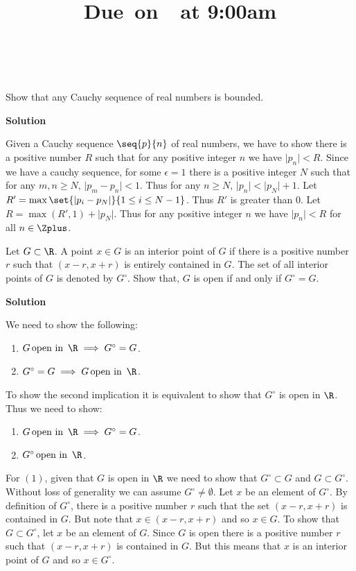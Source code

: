 \documentclass[11pt]{amstext-l}
\title{\vspace{2in}
    \textmd{\textbf{\hmwkClass{STAT 620:\ Introduction to Measure Theoretic Probability}\\
	    \hmwkTitle{1}}}\\
    \normalsize\vspace{0.1in}\small{Due\ on\ \hmwkDueDate{Feb 11,2015}\ at 9:00am}\\
    \vspace{0.1in}\large{\textit{\hmwkClassInstructor{Prof.\ Don Estep}\ 
	    \hmwkClassTime{T-TH:\ 9\textemdash10:15am}}}
    \vspace{3in}}
\author{\textbf{\hmwkAuthorName{Nishant Panda}}}
\date{}
\newcommand{\solution}{\textbf{\large Solution}}
\begin{document}
\maketitle

\pagebreak
\begin{homeworkProblem}[1]
    Show that any Cauchy sequence of real numbers is bounded. 
    
    \solution{}

    Given a Cauchy sequence $\seq{p}{n}$ of real numbers, we have to show there is a positive
    number $R$ such that for any positive integer $n$ we have $\lvert p_n \rvert < R$.
    Since we have a cauchy sequence, for some $\epsilon = 1$ there is a positive integer $N$ such
    that for any $m,n \geq N$, $\lvert p_m - p_n \rvert < 1$. Thus for any $n \geq N$, $\lvert p_n
    \rvert < \lvert p_N \rvert + 1$. Let $R' = \max\set{\lvert p_i - p_N \rvert}{1\leq i \leq N-1}$. 
    Thus $R'$ is greater than $0$. Let $R = \max(R',1) + \lvert p_N \rvert$. 
    Thus for any positive integer $n$ we have $\lvert p_n \rvert < R $ for all $n
    \in \Zplus$.
\end{homeworkProblem}

\pagebreak
\begin{homeworkProblem}[2]
    Let $G \subset \R$. A point $x \in G$ is an interior point of $G$ if there is a positive number
    $r$ such that $\left(x-r,x+r\right)$ is entirely contained in $G$. The set of all interior
    points of $G$ is denoted by $G^{\circ}$. Show that,
    $G$ is open if and only if $G^{\circ} = G$.
\end{homeworkProblem}

\solution{}

We need to show the following:
\begin{enumerate}
    \item $G \text{\,open in \,} \R \implies G^{\circ} = G$. 
    \item $G^{\circ} = G \implies G \text{\,open in \,} \R$. 
\end{enumerate}
To show the second implication it is equivalent to show that $G^{\circ}$ is open in $\R$. Thus we
need to show:
\begin{enumerate}
    \item $G \text{\,open in \,} \R \implies G^{\circ} = G$. 
    \item $G^{\circ} \text{\,open in \,} \R$. 
\end{enumerate}
For $(1)$, given that $G$ is open in $\R$ we need to show that $G^{\circ} \subset G$ and $G \subset
G^{\circ}$. Without loss of generality we can assume $G^{\circ} \neq \emptyset$. Let $x$ be an
element of $G^{\circ}$. By definition of $G^{\circ}$, there is a positive number $r$ such that the
set $(x-r,x+r)$ is contained in $G$. But note that $x \in (x-r,x+r)$ and so $x \in G$.
To show that $G \subset G^{\circ}$, let $x$ be an element of $G$. Since $G$ is open there is a
positive number $r$ such that $(x-r,x+r)$ is contained in $G$. But this means that $x$ is an
interior point of $G$ and so $x \in G^{\circ}$. 
\vspace{0.25in}
\end{document}
